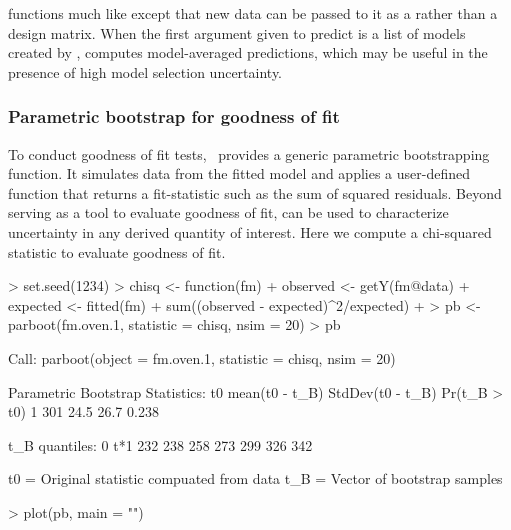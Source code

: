 \documentclass[article,shortnames]{jss}
\newcommand{\um}{\pkg{unmarked}}
\begin{document}
 functions much like  except that new data can be
passed to it as a  rather than a design matrix. When the first 
argument given to predict is a list of models created by , 
 computes model-averaged predictions, which may be
useful in the presence of high model selection uncertainty.  




\subsubsection{Parametric bootstrap for goodness of fit}

To conduct goodness of fit tests, \um\ provides a generic parametric 
bootstrapping function.  It simulates data from the fitted model and 
applies a user-defined function that returns a fit-statistic such as the 
sum of squared residuals.  Beyond serving as a tool to evaluate goodness of fit, 
 can be used to characterize uncertainty in any derived quantity 
of interest. Here we compute a chi-squared statistic to evaluate 
goodness of fit.

\begin{Schunk}
\begin{Sinput}
> set.seed(1234)
> chisq <- function(fm) {
+     observed <- getY(fm@data)
+     expected <- fitted(fm)
+     sum((observed - expected)^2/expected)
+ }
> pb <- parboot(fm.oven.1, statistic = chisq, nsim = 20)
> pb
\end{Sinput}
\begin{Soutput}
Call: parboot(object = fm.oven.1, statistic = chisq, nsim = 20)

Parametric Bootstrap Statistics:
   t0 mean(t0 - t_B) StdDev(t0 - t_B) Pr(t_B > t0)
1 301           24.5             26.7        0.238

t_B quantiles:
     0% 2.5% 25% 50% 75% 97.5% 100%
t*1 232  238 258 273 299   326  342

t0 = Original statistic compuated from data
t_B = Vector of bootstrap samples
\end{Soutput}
\end{Schunk}

\begin{Schunk}
\begin{Sinput}
> plot(pb, main = "")
\end{Sinput}
\end{Schunk}
\end{document}
